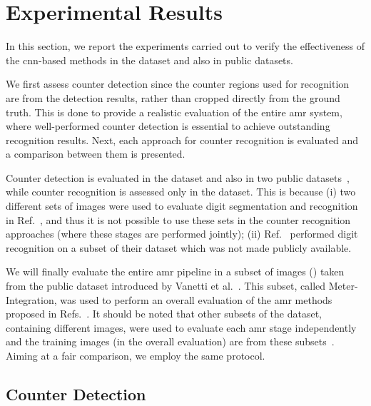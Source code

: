 \section{Experimental Results}
\label{sec:results}

In this section, we report the experiments carried out to verify the effectiveness of the \gls*{cnn}-based methods in the \dataset dataset and also in public datasets. 

We first assess counter detection since the counter regions used for recognition are from the detection results, rather than cropped directly from the ground truth.
This is done to provide a realistic evaluation of the entire \gls*{amr} system, where well-performed counter detection is essential to achieve outstanding recognition results. 
Next, each approach for counter recognition is evaluated and a comparison between them is presented. 

Counter detection is evaluated in the \dataset dataset and also in two public datasets~\cite{vanetti2013gas,goncalves2016reconhecimento}, while counter recognition is assessed only in the \dataset dataset. This is because (i) two different sets of images were used to evaluate digit segmentation and recognition in Ref.~, and thus it is not possible to use these sets in the counter recognition approaches (where these stages are performed jointly); (ii) Ref.~ performed digit recognition on a subset of their dataset which was not made publicly available.

We will finally evaluate the entire \gls*{amr} pipeline in a subset of  images () taken from the public dataset introduced by Vanetti et al.~\cite{vanetti2013gas}. This subset, called Meter-Integration, was used to perform an overall evaluation of the \gls*{amr} methods proposed in Refs.~. It should be noted that other subsets of the dataset, containing different images, were used to evaluate each \gls*{amr} stage independently and the training images (in the overall evaluation) are from these subsets~\cite{vanetti2013gas}. 
Aiming at a fair comparison, we employ the same protocol.

\subsection{Counter Detection}
\label{subsec:results_detection}

